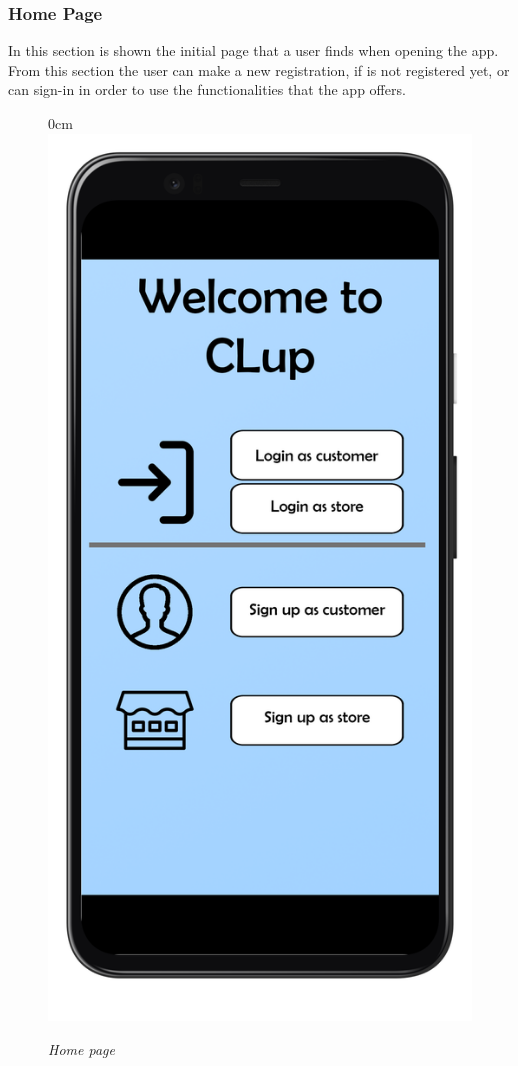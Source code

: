 \documentclass{article}
\begin{document}
		\subsubsection{Home Page}
		In this section is shown the initial page that a user finds when opening the app. From this section the user can make a new registration, if is not registered yet, or can sign-in in order to use the functionalities that the app offers.
		\bigskip
		\bigskip
		\begin{figure}[!h]
			\begin{adjustwidth} {0cm}{}
				\centering
				\includegraphics[scale=0.15]{../Mockups/InitialPage.png}\\
			\end{adjustwidth}
			\caption{\emph{Home page}}
		\end{figure}
		
\end{document}
